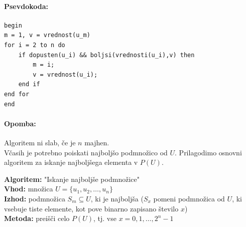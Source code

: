 \documentclass[a4paper,10pt]{article}
\begin{document}
\paragraph{Psevdokoda:}
\begin{flushleft}
\begin{lstlisting}
begin
m = 1, v = vrednost(u_m)
for i = 2 to n do
	if dopusten(u_i) && boljsi(vrednosti(u_i),v) then
		m = i;
		v = vrednost(u_i);
	end if
end for
end
\end{lstlisting}
\end{flushleft}

\paragraph{Opomba:}
Algoritem ni slab, \v ce je $n$ majhen.\\
V\v casih je potrebno poiskati najbolj\v so podmno\v zico
od $U$. Prilagodimo osnovni algoritem za iskanje najbolj\v sega
elementa v $P(U)$.

\begin{flushleft}
\textbf{Algoritem:} "Iskanje najbolj\v se podmno\v zice" \\
\textbf{Vhod:} mno\v zica $U = \{u_1,u_2,\dots,u_n\}$ \\
\textbf{Izhod:} podmno\v zica $S_m \subseteq U$, ki je najbolj\v sa ($S_x$ pomeni podmno\v zica od $U$, ki vsebuje tiste elemente, kot pove binarno zapisano \v stevilo $x$) \\
\textbf{Metoda:} prei\v s\v ci celo $P(U)$, tj. vse $x = 0,1,\dots,2^n-1$\\
\end{flushleft}
\end{document}
